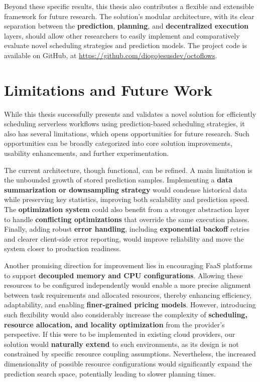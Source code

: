 Beyond these specific results, this thesis also contributes a flexible and extensible framework for future research. The solution's modular architecture, with its clear separation between the \textbf{prediction}, \textbf{planning}, and \textbf{decentralized execution} layers, should allow other researchers to easily implement and comparatively evaluate novel scheduling strategies and prediction models. The project code is available on GitHub, at \url{https://github.com/diogojesusdev/octoflows}.

\section{Limitations and Future Work}
While this thesis successfully presents and validates a novel solution for efficiently scheduling serverless workflows using prediction-based scheduling strategies, it also has several limitations, which opens opportunities for future research. Such opportunities can be broadly categorized into core solution improvements, usability enhancements, and further experimentation.

The current architecture, though functional, can be refined. A main limitation is the unbounded growth of stored prediction samples. Implementing a \textbf{data summarization or downsampling strategy} would condense historical data while preserving key statistics, improving both scalability and prediction speed. The \textbf{optimization system} could also benefit from a stronger abstraction layer to handle \textbf{conflicting optimizations} that override the same execution phases. Finally, adding robust \textbf{error handling}, including \textbf{exponential backoff} retries and clearer client-side error reporting, would improve reliability and move the system closer to production readiness.

Another promising direction for improvement lies in encouraging FaaS platforms to support \textbf{decoupled memory and CPU configurations}. Allowing these resources to be configured independently would enable a more precise alignment between task requirements and allocated resources, thereby enhancing efficiency, adaptability, and enabling \textbf{finer-grained pricing models}. However, introducing such flexibility would also considerably increase the complexity of \textbf{scheduling, resource allocation, and locality optimization} from the provider's perspective. If this were to be implemented in existing cloud providers, our solution would \textbf{naturally extend} to such environments, as its design is not constrained by specific resource coupling assumptions. Nevertheless, the increased dimensionality of possible resource configurations would significantly expand the prediction search space, potentially leading to slower planning times.

